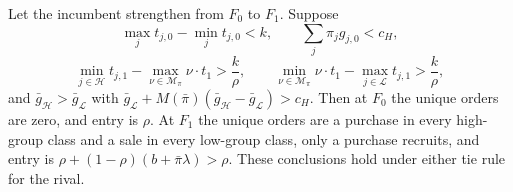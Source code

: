 \begin{proposition}\label{prop:manyclasses}
Let the incumbent strengthen from \(F_0\) to \(F_1\). Suppose
\[
\max_jt_{j,0}-\min_jt_{j,0}<k,\qquad \sum_j\pi_jg_{j,0}<c_H,
\]
\[
\min_{j\in\mathcal H}t_{j,1}-\max_{\nu\in\mathcal M_\pi}\nu\cdot t_1>\frac k\rho,\qquad
\min_{\nu\in\mathcal M_\pi}\nu\cdot t_1-\max_{j\in\mathcal L}t_{j,1}>\frac k\rho,
\]
and \(\bar g_{\mathcal H}>\bar g_{\mathcal L}\) with \(\bar g_{\mathcal L}+M(\bar\pi)(\bar g_{\mathcal H}-\bar
g_{\mathcal L})>c_H\). Then at \(F_0\) the unique orders are zero, and entry is \(\rho\). At \(F_1\) the unique orders
are a purchase in every high-group class and a sale in every low-group class, only a purchase recruits, and entry is
\(\rho+(1-\rho)(b+\bar\pi\lambda)>\rho\). These conclusions hold under either tie rule for the rival.
\end{proposition}

